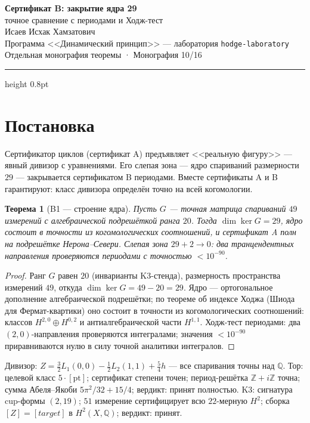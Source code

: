 \documentclass[11pt,a4paper]{article}
\theoremstyle{plain}
\newtheorem{theorem}{Теорема}
\theoremstyle{definition}
\theoremstyle{remark}
\newcommand{\ZZ}{\mathbb{Z}}
\newcommand{\QQ}{\mathbb{Q}}
\begin{document}
\begin{center}
{\LARGE\bfseries Сертификат B: закрытие ядра 29}\\[0.4em]
{\large точное сравнение с периодами и Ходж-тест}\\[0.6em]
{\normalsize Исаев Исхак Хамзатович}\\[0.2em]
{\small Программа <<Динамический принцип>> --- лаборатория \texttt{hodge-laboratory}}\\[0.15em]
{\small Отдельная монография теоремы · Монография 10/16}
\end{center}
\vspace{0.4em}
{\color{linkblue}\hrule height 0.8pt}
\vspace{0.8em}

\section{Постановка}

Сертификатор циклов (сертификат A) предъявляет <<реальную фигуру>> ---
явный дивизор с уравнениями. Его слепая зона --- ядро спариваний
размерности $29$ --- закрывается сертификатом B периодами. Вместе
сертификаты A и B гарантируют: класс дивизора определён точно на
всей когомологии.

\begin{theorem}[B1 --- строение ядра]\label{th:B1}
Пусть $G$ --- точная матрица спариваний $49$ измерений с
алгебраической подрешёткой ранга $20$. Тогда $\dim\ker G=29$, ядро
состоит в точности из когомологических соотношений, и сертификат A
полн на подрешётке Нерона--Севери. Слепая зона $29+2\to0$: два
транцендентных направления проверяются периодами с точностью
$<10^{-90}$.
\end{theorem}

\begin{proof}
Ранг $G$ равен $20$ (инварианты K3-стенда), размерность
пространства измерений $49$, откуда $\dim\ker G=49-20=29$. Ядро ---
ортогональное дополнение алгебраической подрешётки; по теореме об
индексе Ходжа (Шиода для Фермат-квартики) оно состоит в точности из
когомологических соотношений: классов $H^{2,0}\oplus H^{0,2}$ и
антиалгебраической части $H^{1,1}$. Ходж-тест периодами: два
$(2,0)$-направления проверяются интегралами; значения $<10^{-90}$
приравниваются нулю в силу точной аналитики интегралов.
\end{proof}

\begin{databox}
Дивизор: $Z=\tfrac32 L_1(0,0)-\tfrac12 L_2(1,1)+\tfrac54 h$ ---
все спаривания точны над $\QQ$.
Тор: целевой класс $5\cdot[\mathrm{pt}]$; сертификат степени точен;
период-решётка $\ZZ+i\ZZ$ точна; сумма Абеля--Якоби
$5\pi^2/32+15/4$; вердикт: принят полностью.
K3: сигнатура cup-формы $(2,19)$; $51$ измерение сертифицирует всю
$22$-мерную $H^2$; сборка $[Z]=[target]$ в $H^2(X,\QQ)$; вердикт:
принят.
\end{databox}
\end{document}
